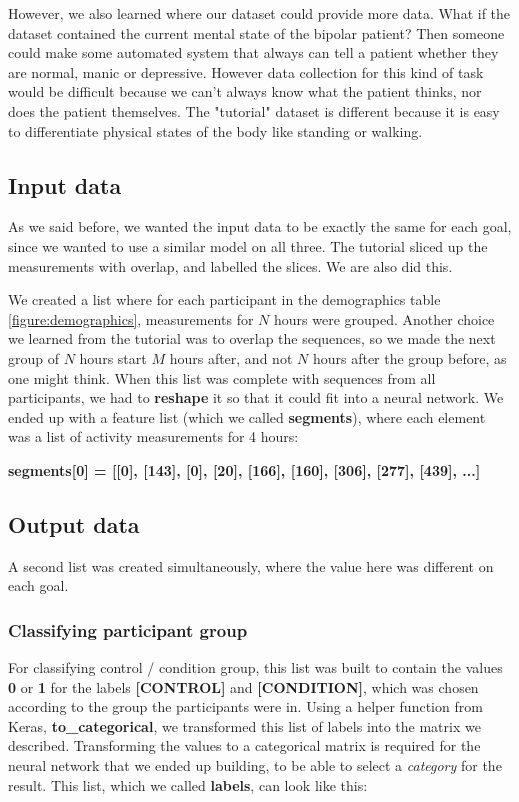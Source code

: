 However, we also learned where our dataset could provide more data. 
What if the dataset contained the current mental state of the bipolar patient? Then someone could make some automated system that always can tell a patient 
whether they are normal, manic or depressive. However data collection for this kind of task would be difficult because we can't always know what the
patient thinks, nor does the patient themselves. The "tutorial" dataset is different because it is easy to differentiate physical states of the body
like standing or walking.

\subsection{Input data}

As we said before, we wanted the input data to be exactly the same for each goal, since we wanted to use a similar model on all three.
The tutorial \cite{1d_cnn} sliced up the measurements with overlap, and labelled the slices. We are also did this.

We created a list where for each participant in the demographics table \ref{figure:demographics}, measurements for $N$ hours were grouped. 
Another choice we learned from the tutorial was to overlap the sequences, so we made the next group of $N$ hours start \textit{$M$} hours after, 
and not \textit{$N$} hours after the group before, as one might think. When this list was complete with sequences from all participants, we 
had to \textbf{reshape} it so that it could fit into a neural network. We ended up with a feature list (which we called \textbf{segments}), 
where each element was a list of activity measurements for 4 hours: 

\textbf{segments[0] = [[0], [143], [0], [20], [166], [160], [306], [277], [439], ...]}

\subsection{Output data}

A second list was created simultaneously, where the value here was different on each goal. 

\subsubsection{Classifying participant group}
For classifying control / condition group, this list was built to contain the values \textbf{0} or \textbf{1} for the labels
\textbf{[CONTROL]} and \textbf{[CONDITION]}, which was chosen according to the group the participants were in. Using a helper function from Keras, 
\textbf{to\_categorical}, we transformed this list of labels into the matrix we described. Transforming the values to a
categorical matrix is required for the neural network that we ended up building, to be able to select a \textit{category} for the result. 
This list, which we called \textbf{labels}, can look like this: 

